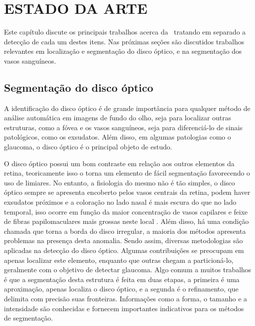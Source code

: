 \chapter{ESTADO DA ARTE}\label{cap3}

Este capítulo discute os principais trabalhos acerca da \tema\ tratando em separado a detecção de cada um destes itens. Nas próximas seções são discutidos trabalhos relevantes em  localização e segmentação do disco óptico, e na segmentação dos vasos sanguíneos.


\section{Segmentação do disco óptico}

A identificação do disco óptico é de grande importância para qualquer método de análise automática em imagens de fundo do olho, seja para localizar outras estruturas, como a fóvea e os vasos sanguíneos, seja para diferenciá-lo de sinais patológicos, como os exsudatos. Além disso, em algumas patologias como o glaucoma, o disco óptico é o principal objeto de estudo.  



O disco óptico possui um bom contraste em relação aos outros elementos da retina, teoricamente isso o torna um elemento de fácil segmentação favorecendo o uso de limiares. No entanto, a fisiologia do mesmo não é tão simples, o disco óptico sempre se apresenta encoberto pelos vasos centrais da retina, podem haver exsudatos próximos e a coloração no lado nasal é mais escura do que no lado temporal, isso ocorre em função da maior concentração de vasos capilares e feixe de fibras papilomaculares mais grossas neste local \cite{Dorion}. Além disso, há uma condição chamada   que torna a borda do disco irregular, a maioria dos métodos apresenta problemas na presença desta anomalia. Sendo assim, diversas metodologias são aplicadas na detecção do disco óptico. Algumas contribuições se preocupam em apenas localizar este elemento, enquanto que outras chegam a particioná-lo, geralmente com o objetivo de detectar glaucoma.  Algo comum a muitos trabalhos é que a segmentação desta estrutura  é feita em duas etapas, a primeira é uma aproximação, apenas localiza o disco óptico, e a segunda é o refinamento, que delimita com precisão suas fronteiras. Informações como a forma, o tamanho e a intensidade são conhecidas e fornecem importantes indicativos para os métodos de segmentação. 

